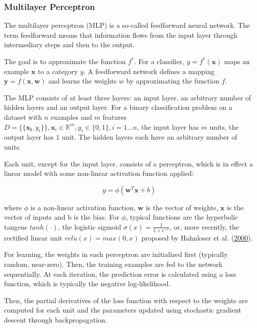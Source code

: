 \documentclass[
  11pt,
  a4paper,
  DIV=12,captions=tableheading,oneside,titlepage=firstiscover,abstracton]{scrreprt}
\begin{document}
\hypertarget{multilayer-perceptron}{%
\subsubsection{Multilayer Perceptron}\label{multilayer-perceptron}}

The multilayer perceptron (MLP) is a so-called feedforward neural network. The term feedforward means that information flows from the input layer through intermediary steps and then to the output.

The goal is to approximate the function \(f^*\). For a classifier, \(y = f^*(\mathbf{x})\) maps an example \(\mathbf{x}\) to a category \(y\). A feedforward network defines a mapping \(\mathbf{y}=f(\mathbf{x}, \mathbf{w})\) and learns the weights \(w\) by approximating the function \(f\).

The MLP consists of at least three layers: an input layer, an arbitrary number of hidden layers and an output layer. For a binary classification problem on a dataset with \(n\) examples and \(m\) features \(D = \{\{\mathbf{x_i}, y_i\}\}, \mathbf{x}_i \in \mathbb{R}^m, y_i \in \{0,1\}, i = 1...n\), the input layer has \(m\) units, the output layer has \(1\) unit. The hidden layers each have an arbitrary number of units.

Each unit, except for the input layer, consists of a perceptron, which is in effect a linear model with some non-linear activation function applied:

\begin{equation}
y = \phi(\mathbf{w}^T\mathbf{x}+b)
\label{eq:perceptron}
\end{equation}

where \(\phi\) is a non-linear activation function, \(\mathbf{w}\) is the vector of weights, \(\mathbf{x}\) is the vector of inputs and b is the bias. For \(\phi\), typical functions are the hyperbolic tangens \(tanh(\cdot)\), the logistic sigmoid \(\sigma(x) = \frac{1}{1+e^{-x}}\), or, more recently, the rectified linear unit \(relu(x) = max(0,x)\) proposed by Hahnloser et al. (\protect\hyperlink{ref-hahnloser2000digital}{2000}).

For learning, the weights in each perceptron are initialized first (typically random, near-zero). Then, the training examples are fed to the network sequentially. At each iteration, the prediction error is calculated using a loss function, which is typically the negative log-likelihood.

Then, the partial derivatives of the loss function with respect to the weights are computed for each unit and the parameters updated using stochastic gradient descent through backpropagation.
\end{document}
